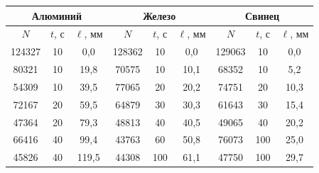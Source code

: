 \begin{enumerate}
    \begin{table}[h!]
        \centering
        \begin{tabular}{|ccc|ccc|ccc|}
            \hline
            \multicolumn{3}{|c|}{Алюминий}                                          & \multicolumn{3}{c|}{Железо}                                            & \multicolumn{3}{c|}{Свинец}                                            \\ \hline
            \multicolumn{1}{|c|}{$N$}    & \multicolumn{1}{c|}{$t$, с} & $\ell$, мм & \multicolumn{1}{c|}{$N$}    & \multicolumn{1}{c|}{$t$, с} & $\ell$, мм & \multicolumn{1}{c|}{$N$}    & \multicolumn{1}{c|}{$t$, с} & $\ell$, мм \\ \hline
            \multicolumn{1}{|c|}{124327} & \multicolumn{1}{c|}{10}     & 0,0        & \multicolumn{1}{c|}{128362} & \multicolumn{1}{c|}{10}     & 0,0        & \multicolumn{1}{c|}{129063} & \multicolumn{1}{c|}{10}     & 0,0        \\ \hline
            \multicolumn{1}{|c|}{80321}  & \multicolumn{1}{c|}{10}     & 19,8       & \multicolumn{1}{c|}{70575}  & \multicolumn{1}{c|}{10}     & 10,1       & \multicolumn{1}{c|}{68352}  & \multicolumn{1}{c|}{10}     & 5,2        \\ \hline
            \multicolumn{1}{|c|}{54309}  & \multicolumn{1}{c|}{10}     & 39,5       & \multicolumn{1}{c|}{77065}  & \multicolumn{1}{c|}{20}     & 20,2       & \multicolumn{1}{c|}{74751}  & \multicolumn{1}{c|}{20}     & 10,3       \\ \hline
            \multicolumn{1}{|c|}{72167}  & \multicolumn{1}{c|}{20}     & 59,5       & \multicolumn{1}{c|}{64879}  & \multicolumn{1}{c|}{30}     & 30,3       & \multicolumn{1}{c|}{61643}  & \multicolumn{1}{c|}{30}     & 15,4       \\ \hline
            \multicolumn{1}{|c|}{47364}  & \multicolumn{1}{c|}{20}     & 79,3       & \multicolumn{1}{c|}{48813}  & \multicolumn{1}{c|}{40}     & 40,5       & \multicolumn{1}{c|}{49065}  & \multicolumn{1}{c|}{40}     & 20,2       \\ \hline
            \multicolumn{1}{|c|}{66416}  & \multicolumn{1}{c|}{40}     & 99,4       & \multicolumn{1}{c|}{43763}  & \multicolumn{1}{c|}{60}     & 50,8       & \multicolumn{1}{c|}{76073}  & \multicolumn{1}{c|}{100}    & 25,0       \\ \hline
            \multicolumn{1}{|c|}{45826}  & \multicolumn{1}{c|}{40}     & 119,5      & \multicolumn{1}{c|}{44308}  & \multicolumn{1}{c|}{100}    & 61,1       & \multicolumn{1}{c|}{47750}  & \multicolumn{1}{c|}{100}    & 29,7       \\ \hline

\end{tabular}
\end{table}
\end{enumerate}

